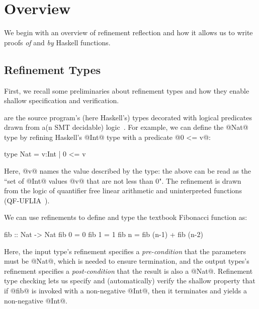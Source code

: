 \section{Overview}
\label{sec:overview}
\label{sec:examples}

We begin with an overview of refinement reflection and
how it allows us to write proofs \emph{of} and \emph{by}
Haskell functions.

\subsection{Refinement Types}

First, we recall some preliminaries about refinement types
and how they enable shallow specification and verification.

 are the source program's (here
Haskell's) types decorated with logical predicates drawn
from a(n SMT decidable) logic~\citep{ConstableS87,Rushby98}.
%
For example, we can define the @Nat@ type by refining
Haskell's @Int@ type with a predicate @0 <= v@:
%
\begin{code}
  type Nat = { v:Int | 0 <= v }
\end{code}
%
Here, @v@ names the value described by the type:
the above can be read as the
``set of @Int@ values @v@ that are not less than 0".
The refinement is drawn from the logic of quantifier
free linear arithmetic and uninterpreted functions
(QF-UFLIA~\cite{SMTLIB2}).

%
We can use refinements to define and type the
textbook Fibonacci function as:
%
\begin{code}
  fib :: Nat -> Nat
  fib 0 = 0
  fib 1 = 1
  fib n = fib (n-1) + fib (n-2)
\end{code}
%
Here, the input type's refinement specifies a
\emph{pre-condition} that the parameters must
be @Nat@, which is needed to ensure termination,
and the output types's refinement specifies a
\emph{post-condition} that the result is also a @Nat@.
%
Refinement type checking lets us specify
and (automatically) verify the shallow property
that if @fib@ is invoked with a non-negative
@Int@, then it terminates and yields
a non-negative @Int@.

